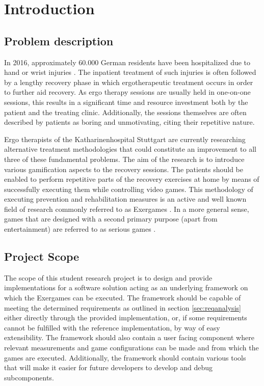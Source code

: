 \chapter{Introduction}
\label{sec:introduction}
\section{Problem description}
In 2016, approximately 60.000 German residents have been hospitalized due to hand or wrist injuries \cite{DeStatisHandInjuries}. The inpatient treatment of such injuries is often followed by a lengthy recovery phase in which ergotherapeutic treatment occurs in order to further aid recovery. As ergo therapy sessions are usually held in one-on-one sessions, this results in a significant time and resource investment both by the patient and the treating clinic. Additionally, the sessions themselves are often described by patients as boring and unmotivating, citing their repetitive nature.

Ergo therapists of the Katharinenhospital Stuttgart are currently researching alternative treatment methodologies that could constitute an improvement to all three of these fundamental problems. The aim of the research is to introduce various gamification aspects to the recovery sessions. The patients should be enabled to perform repetitive parts of the recovery exercises at home by means of successfully executing them while controlling video games. This methodology of executing prevention and rehabilitation measures is an active and well known field of research commonly referred to as Exergames \cite{RehaCareExergames}. In a more general sense, games that are designed with a second primary purpose (apart from entertainment) are referred to as serious games \cite{SeriousGamesBook}. 

\section{Project Scope}
\label{sec:scope}
The scope of this student research project is to design and provide implementations for a software solution acting as an underlying framework on which the Exergames can be executed. The framework should be capable of meeting the determined requirements as outlined in section \ref{sec:reqanalysis} either directly through the provided implementation, or, if some requirements cannot be fulfilled with the reference implementation, by way of easy extensibility. The framework should also contain a user facing component where relevant measurements and game configurations can be made and from which the games are executed. Additionally, the framework should contain various tools that will make it easier for future developers to develop and debug subcomponents.

